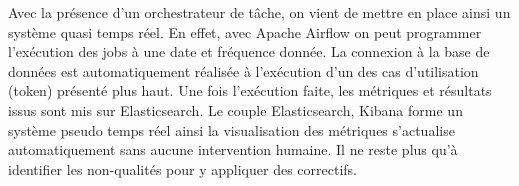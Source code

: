 Avec la pr\'esence d'un orchestrateur de t\^ache, on vient de mettre en place ainsi un syst\`eme quasi temps r\'eel. En effet, avec Apache Airflow on peut programmer l'exécution des jobs \`a une date et fr\'equence donn\'ee. La connexion \`a la base de donn\'ees est automatiquement r\'ealis\'ee \`a l'exécution d'un des cas d'utilisation (token) pr\'esent\'e plus haut. Une fois l'exécution faite, les m\'etriques et r\'esultats issus sont mis sur Elasticsearch. Le couple Elasticsearch, Kibana forme un syst\`eme pseudo temps r\'eel ainsi la visualisation des m\'etriques s'actualise automatiquement sans aucune intervention humaine. Il ne reste plus qu'\`a identifier les non-qualit\'es pour y appliquer des correctifs.


